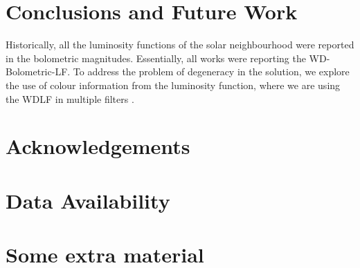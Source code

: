 \documentclass[fleqn,usenatbib]{mnras}
\begin{document}
\section{Conclusions and Future Work}
Historically, all the luminosity functions of the solar neighbourhood were reported
in the bolometric magnitudes. Essentially, all works were reporting the
WD-Bolometric-LF. To address the problem of degeneracy in the solution, we explore
the use of colour information from the luminosity function, where we are using
the WDLF in multiple filters . 



\section*{Acknowledgements}


\section*{Data Availability}










\appendix

\section{Some extra material}



\bsp	%
\label{lastpage}
\end{document}
